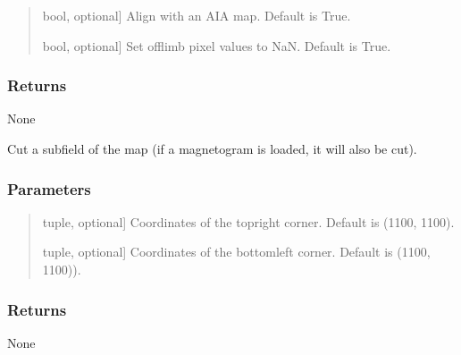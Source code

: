 \documentclass[letterpaper,10pt,english]{sphinxmanual}
\begin{document}
\begin{fulllineitems}
\begin{fulllineitems}
\begin{quote}
\begin{description}
\begin{description}
\sphinxlineitem{align}{[}bool, optional{]}
\sphinxAtStartPar
Align with an AIA map. Default is True.

\sphinxlineitem{cut\_limb}{[}bool, optional{]}
\sphinxAtStartPar
Set off\sphinxhyphen{}limb pixel values to NaN. Default is True.

\end{description}

\end{description}
\end{quote}


\subsubsection{Returns}
\label{\detokenize{pycatch/pycatch:id10}}
\sphinxAtStartPar
None

\end{fulllineitems}


\begin{fulllineitems}
\label{\detokenize{pycatch/pycatch:pycatch.pycatch.pycatch.cutout}}
\pysigstartsignatures
{}
\pysigstopsignatures
\sphinxAtStartPar
Cut a subfield of the map (if a magnetogram is loaded, it will also be cut).


\subsubsection{Parameters}
\label{\detokenize{pycatch/pycatch:id11}}\begin{quote}
\begin{description}
\sphinxlineitem{top}{[}tuple, optional{]}
\sphinxAtStartPar
Coordinates of the top\sphinxhyphen{}right corner. Default is (1100, 1100).

\sphinxlineitem{bot}{[}tuple, optional{]}
\sphinxAtStartPar
Coordinates of the bottom\sphinxhyphen{}left corner. Default is (\sphinxhyphen{}1100, \sphinxhyphen{}1100)).

\end{description}
\end{quote}


\subsubsection{Returns}
\label{\detokenize{pycatch/pycatch:id12}}
\sphinxAtStartPar
None


\end{fulllineitems}
\end{fulllineitems}
\end{document}
